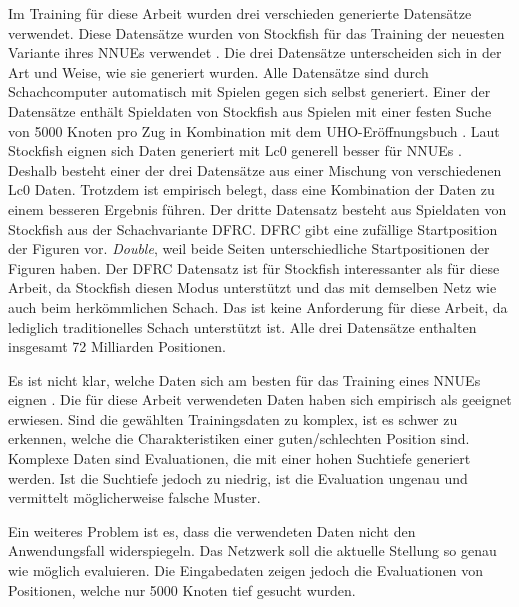 Im Training für diese Arbeit wurden drei verschieden generierte Datensätze verwendet. Diese Datensätze wurden von Stockfish für das Training der neuesten Variante ihres \acp{NNUE} verwendet \cite{StockfishNewestNetJul04}. Die drei Datensätze unterscheiden sich in der Art und Weise, wie sie generiert wurden. Alle Datensätze sind durch Schachcomputer automatisch mit Spielen gegen sich selbst generiert. Einer der Datensätze enthält Spieldaten von Stockfish aus Spielen mit einer festen Suche von 5000 Knoten pro Zug in Kombination mit dem \ac{UHO}-Eröffnungsbuch \cite{Pohl2021}. Laut Stockfish eignen sich Daten generiert mit \ac{Lc0} generell besser für \acp{NNUE} \cite{StockfishTrainingDataWiki}. Deshalb besteht einer der drei Datensätze aus einer Mischung von verschiedenen \ac{Lc0} Daten. Trotzdem ist empirisch belegt, dass eine Kombination der Daten zu einem besseren Ergebnis führen. Der dritte Datensatz besteht aus Spieldaten von Stockfish aus der Schachvariante \ac{DFRC}. \ac{DFRC} gibt eine zufällige Startposition der Figuren vor. \emph{Double}, weil beide Seiten unterschiedliche Startpositionen der Figuren haben. Der \ac{DFRC} Datensatz ist für Stockfish interessanter als für diese Arbeit, da Stockfish diesen Modus unterstützt und das mit demselben Netz wie auch beim herkömmlichen Schach. Das ist keine Anforderung für diese Arbeit, da lediglich traditionelles Schach unterstützt ist. Alle drei Datensätze enthalten insgesamt 72 Milliarden Positionen.

Es ist nicht klar, welche Daten sich am besten für das Training eines \acp{NNUE} eignen \cite{StockfishNNUE}. Die für diese Arbeit verwendeten Daten haben sich empirisch als geeignet erwiesen. Sind die gewählten Trainingsdaten zu komplex, ist es schwer zu erkennen, welche die Charakteristiken einer guten/schlechten Position sind. Komplexe Daten sind Evaluationen, die mit einer hohen Suchtiefe generiert werden. Ist die Suchtiefe jedoch zu niedrig, ist die Evaluation ungenau und vermittelt möglicherweise falsche Muster.

Ein weiteres Problem ist es, dass die verwendeten Daten nicht den Anwendungsfall widerspiegeln. Das Netzwerk soll die aktuelle Stellung so genau wie möglich evaluieren. Die Eingabedaten zeigen jedoch die Evaluationen von Positionen, welche \zb{} nur 5000 Knoten tief gesucht wurden.

